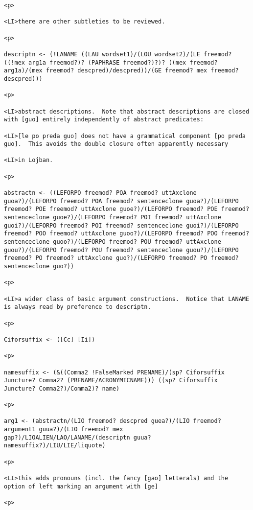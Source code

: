 \documentclass[12pt]{article}
\begin{document}
\begin{lstlisting}
<p>

<LI>there are other subtleties to be reviewed.

<p>

descriptn <- (!LANAME ((LAU wordset1)/(LOU wordset2)/(LE freemod? ((!mex arg1a freemod?)? (PAPHRASE freemod?)?)? ((mex freemod? arg1a)/(mex freemod? descpred)/descpred))/(GE freemod? mex freemod? descpred)))

<p>

<LI>abstract descriptions.  Note that abstract descriptions are closed with [guo] entirely independently of abstract predicates:

<LI>[le po preda guo] does not have a grammatical component [po preda guo].  This avoids the double closure often apparently necessary

<LI>in Lojban.

<p>

abstractn <- ((LEFORPO freemod? POA freemod? uttAxclone guoa?)/(LEFORPO freemod? POA freemod? sentenceclone guoa?)/(LEFORPO freemod? POE freemod? uttAxclone guoe?)/(LEFORPO freemod? POE freemod? sentenceclone guoe?)/(LEFORPO freemod? POI freemod? uttAxclone guoi?)/(LEFORPO freemod? POI freemod? sentenceclone guoi?)/(LEFORPO freemod? POO freemod? uttAxclone guoo?)/(LEFORPO freemod? POO freemod? sentenceclone guoo?)/(LEFORPO freemod? POU freemod? uttAxclone guou?)/(LEFORPO freemod? POU freemod? sentenceclone guou?)/(LEFORPO freemod? PO freemod? uttAxclone guo?)/(LEFORPO freemod? PO freemod? sentenceclone guo?))

<p>

<LI>a wider class of basic argument constructions.  Notice that LANAME is always read by preference to descriptn.

<p>

Ciforsuffix <- ([Cc] [Ii])

<p>

namesuffix <- (&((Comma2 !FalseMarked PRENAME)/(sp? Ciforsuffix Juncture? Comma2? (PRENAME/ACRONYMICNAME))) ((sp? Ciforsuffix Juncture? Comma2?)/Comma2)? name)

<p>

arg1 <- (abstractn/(LIO freemod? descpred guea?)/(LIO freemod? argument1 guua?)/(LIO freemod? mex gap?)/LIOALIEN/LAO/LANAME/(descriptn guua? namesuffix?)/LIU/LIE/liquote)

<p>

<LI>this adds pronouns (incl. the fancy [gao] letterals) and the option of left marking an argument with [ge]

<p>


\end{lstlisting}
\end{document}
